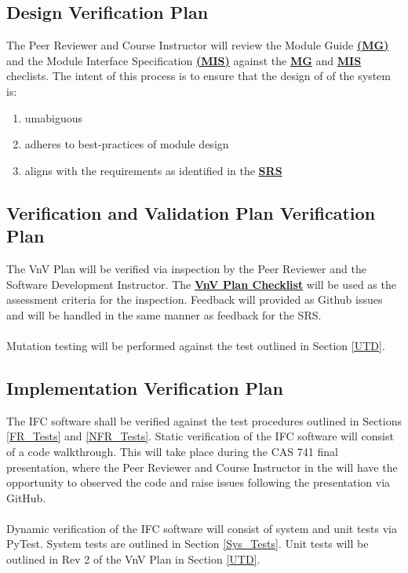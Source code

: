 \documentclass[12pt, titlepage]{article}
\begin{document}
\subsection{Design Verification Plan}
The Peer Reviewer and Course Instructor will review the Module Guide 
\textbf{\href{https://github.com/KiranSingh15/CAS-741-Image-Correspondences/blob/main/docs/Design/SoftArchitecture/MG.pdf}
{(MG)}} and the Module Interface Specification 
\textbf{\href{https://github.com/KiranSingh15/CAS-741-Image-Correspondences/blob/main/docs/Design/SoftDetailedDes/MIS.pdf}
{(MIS)}} against the 
\textbf{\href{https://github.com/KiranSingh15/CAS-741-Image-Correspondences/blob/main/docs/Checklists/MG-Checklist.pdf}
{MG}} and
\textbf{\href{https://github.com/KiranSingh15/CAS-741-Image-Correspondences/blob/main/docs/Checklists/MIS-Checklist.pdf}
{MIS}} checlists. The intent of this process is to ensure that the design of of the system is:
\begin{enumerate}
\item umabiguous
\item adheres to best-practices of module design
\item aligns with the requirements as identified in the 
\textbf{\href{https://github.com/KiranSingh15/CAS-741-Image-Correspondences/blob/main/docs/SRS/SRS.pdf}
{SRS}}
\end{enumerate}




\subsection{Verification and Validation Plan Verification Plan}
The VnV Plan will be verified via inspection by the Peer Reviewer and the 
Software Development Instructor. The 
\textbf{\href{https://github.com/KiranSingh15/CAS-741-Image-Correspondences/blob/main/docs/Checklists/SRS-Checklist.pdf}
{VnV Plan Checklist}} 
will be used as the assessment criteria for the inspection. 
Feedback will provided as Github issues and will be handled in the same manner as feedback 
for the SRS.\\ \\
Mutation testing will be performed against the test outlined in Section \ref{UTD}.

\subsection{Implementation Verification Plan}
The IFC software shall be verified against the test procedures outlined in Sections \ref{FR_Tests} and 
\ref{NFR_Tests}. Static verification of the IFC software will consist of a code walkthrough. This will take 
place during the CAS 741 final presentation, where the Peer Reviewer and Course Instructor in the 
will have the opportunity to observed the code and raise issues following the presentation via GitHub. \\ \\
Dynamic  verification of the IFC software will consist of system and unit tests via PyTest. System tests 
are outlined in Section \ref{Sys_Tests}. Unit tests will be outlined in Rev 2 of the VnV Plan in 
Section \ref{UTD}.
\end{document}
